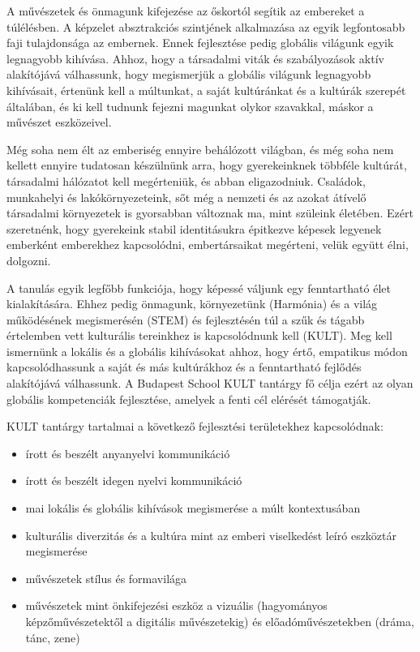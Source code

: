 A művészetek és önmagunk kifejezése az őskortól segítik az embereket a túlélésben. A képzelet absztrakciós szintjének alkalmazása az egyik legfontosabb faji tulajdonsága az embernek. Ennek fejlesztése pedig globális világunk egyik legnagyobb kihívása. Ahhoz, hogy a társadalmi viták és szabályozások aktív alakítójává válhassunk, hogy megismerjük a globális világunk legnagyobb kihívásait, értenünk kell a múltunkat, a saját kultúránkat és a kultúrák szerepét általában, és ki kell tudnunk fejezni magunkat olykor szavakkal, máskor a művészet eszközeivel.

Még soha nem élt az emberiség ennyire behálózott világban, és még soha nem kellett ennyire tudatosan készülnünk arra, hogy gyerekeinknek többféle kultúrát, társadalmi hálózatot kell megérteniük, és abban eligazodniuk. Családok, munkahelyi és lakókörnyezeteink, sőt még a nemzeti és az azokat átívelő társadalmi környezetek is gyorsabban változnak ma, mint szüleink életében. Ezért szeretnénk, hogy gyerekeink stabil identitásukra épitkezve képesek legyenek emberként emberekhez kapcsolódni, embertársaikat megérteni, velük együtt élni, dolgozni.


A tanulás egyik legfőbb funkciója, hogy képessé váljunk egy fenntartható élet kialakítására. Ehhez pedig önmagunk, környezetünk (Harmónia) és a világ működésének megismerésén (STEM) és fejlesztésén túl a szűk és tágabb értelemben vett kulturális tereinkhez is kapcsolódnunk kell (KULT). Meg kell ismernünk a lokális és a globális kihívásokat ahhoz, hogy értő, empatikus módon kapcsolódhassunk a saját és más kultúrákhoz és a fenntartható fejlődés alakítójává válhassunk. A Budapest School KULT tantárgy fő célja ezért az olyan globális kompetenciák fejlesztése, amelyek a fenti cél elérését támogatják.

KULT tantárgy tartalmai a következő fejlesztési területekhez kapcsolódnak:
\begin{itemize}
\item írott és beszélt anyanyelvi kommunikáció

\item írott és beszélt idegen nyelvi kommunikáció

\item mai lokális és globális kihívások megismerése a múlt kontextusában

\item kulturális diverzitás és a kultúra mint az emberi viselkedést leíró eszköztár megismerése

\item művészetek stílus és formavilága

\item művészetek mint önkifejezési eszköz a vizuális (hagyományos képzőművészetektől a digitális művészetekig) és előadóművészetekben (dráma, tánc, zene)
\end{itemize}

